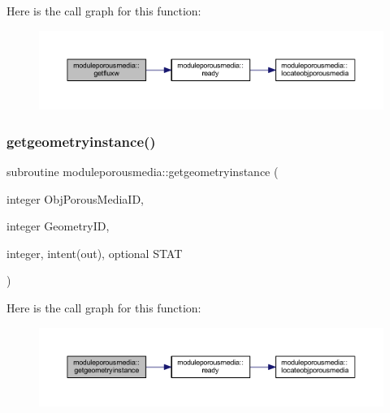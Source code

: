 Here is the call graph for this function\+:\nopagebreak
\begin{figure}[H]
\begin{center}
\leavevmode
\includegraphics[width=350pt]{namespacemoduleporousmedia_a5f6e92f6c7e21ae5b9a8b35203c299c7_cgraph}
\end{center}
\end{figure}
\mbox{\label{namespacemoduleporousmedia_abf74842fd7f071be6dfbcb008ae86d92}} 
\subsubsection{\texorpdfstring{getgeometryinstance()}{getgeometryinstance()}}
{\footnotesize\ttfamily subroutine moduleporousmedia\+::getgeometryinstance (\begin{DoxyParamCaption}\item[{integer}]{Obj\+Porous\+Media\+ID,  }\item[{integer}]{Geometry\+ID,  }\item[{integer, intent(out), optional}]{S\+T\+AT }\end{DoxyParamCaption})\hspace{0.3cm}{\ttfamily [private]}}

Here is the call graph for this function\+:\nopagebreak
\begin{figure}[H]
\begin{center}
\leavevmode
\includegraphics[width=350pt]{namespacemoduleporousmedia_abf74842fd7f071be6dfbcb008ae86d92_cgraph}
\end{center}
\end{figure}
\mbox{\label{namespacemoduleporousmedia_a959d8f66b0c720fa0d26da43495843eb}} 
